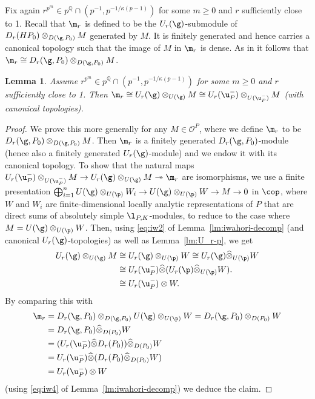 \documentclass[a4paper]{amsart}
\numberwithin{equation}{section}
\newtheorem{lem}[thm]{Lemma}
\theoremstyle{remark}
\theoremstyle{definition}
\newcommand{\Q}{\mathbb{Q}}
\newcommand{\onto}{\twoheadrightarrow}
\newcommand{\wh}[1]{\widehat{#1}}
\begin{document}
Fix again $r^{p^m} \in p^{\Q} \cap (p^{-1},p^{-1/\kappa(p-1)})$ for some $m \ge 0$ and $r$ sufficiently close to 1.
Recall that $\m_r$ is defined to be the $U_r(\g)$-submodule of $D_r(HP_0) \otimes_{D(\g,P_0)} M$ generated by $M$.
It is finitely generated and hence carries a canonical topology such that the image of $M$ in $\m_r$ is dense.
As in \cite[Sublemma 5.6]{OS2}
it follows that $\m_r \cong D_r(\g,P_0) \otimes_{D(\g,P_0)} M$.

\begin{lem}\label{lm:m_r}
  Assume $r^{p^m} \in p^{\Q} \cap (p^{-1},p^{-1/\kappa(p-1)})$ for some $m \ge 0$ and $r$ sufficiently close to 1.
  Then $\m_r \cong U_r(\g) \otimes_{U(\g)} M \cong U_r(\u_P^-) \otimes_{U(\u_P^-)} M$ (with canonical topologies).
\end{lem}

\begin{proof}
  We prove this more generally for any $M \in \mathcal O^P$, where we define $\m_r$ to be $D_r(\g,P_0) \otimes_{D(\g,P_0)} M$.
  Then $\m_r$ is a finitely generated $D_r(\g,P_0)$-module (hence also a finitely generated $U_r(\g)$-module) and we endow it with its canonical topology.
  To show that the natural maps $U_r(\u_P^-) \otimes_{U(\u_P^-)} M \to U_r(\g) \otimes_{U(\g)} M \onto \m_r$ are isomorphisms,
  we use a finite presentation $\bigoplus_{i=1}^n U(\g) \otimes_{U(\p)} W_i \to U(\g) \otimes_{U(\p)} W \to M \to 0$ in $\cop$, where $W$ and $W_i$ are   finite-dimensional locally analytic representations of $P$ that are direct sums of absolutely simple $\l_{P,K}$-modules, 
  to reduce to the case where $M = U(\g) \otimes_{U(\p)} W$. 
  Then, using \eqref{eq:iw2} of Lemma~\ref{lm:iwahori-decomp} (and canonical $U_r(\g)$-topologies) as well as Lemma~\ref{lm:U_r-p}, we get
  \begin{align*}
    U_r(\g) \otimes_{U(\g)} M & \cong U_r(\g) \otimes_{U(\p)} W \cong U_r(\g) \wh\otimes_{U(\p)} W \\
    & \cong U_r(\u_P^-) \wh\otimes (U_r(\p) \wh\otimes_{U(\p)} W). \\
    & \cong U_r(\u_P^-) \otimes W.
  \end{align*}
  By comparing this with
  \begin{align*}
    \m_r &= D_r(\g,P_0) \otimes_{D(\g,P_0)} U(\g) \otimes_{U(\p)} W = D_r(\g,P_0) \otimes_{D(P_0)} W \\
           & = D_r(\g,P_0) \wh\otimes_{D(P_0)} W \\
    &= (U_r(\u_P^-) \wh\otimes D_r(P_0)) \wh\otimes_{D(P_0)} W \\
    &= U_r(\u_P^-) \wh\otimes (D_r(P_0) \wh\otimes_{D(P_0)} W) \\
    &= U_r(\u_P^-) \otimes W
  \end{align*}
  (using \eqref{eq:iw4} of Lemma~\ref{lm:iwahori-decomp}) we deduce the claim.
\end{proof}
\end{document}
